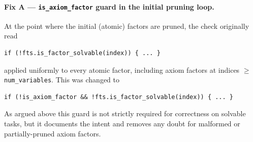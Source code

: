 \documentclass[11pt,a4paper]{article}
\begin{document}
\paragraph{Fix A --- \texttt{is\_axiom\_factor} guard in the initial pruning loop.}
At the point where the initial (atomic) factors are pruned, the check
originally read
\begin{lstlisting}
if (!fts.is_factor_solvable(index)) { ... }
\end{lstlisting}
applied uniformly to every atomic factor, including axiom factors at indices
$\geq$ \texttt{num\_variables}. This was changed to
\begin{lstlisting}
if (!is_axiom_factor && !fts.is_factor_solvable(index)) { ... }
\end{lstlisting}
As argued above this guard is not strictly required for correctness on
solvable tasks, but it documents the intent and removes any doubt for
malformed or partially-pruned axiom factors.
\end{document}
